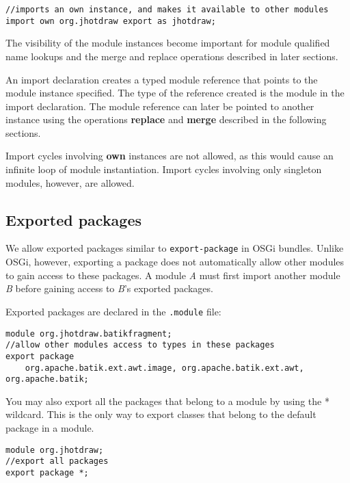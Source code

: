 \begin{lstlisting}
//imports an own instance, and makes it available to other modules
import own org.jhotdraw export as jhotdraw;
\end{lstlisting}

The visibility of the module instances become important for module
qualified name lookups and the merge and replace operations described in later
sections.

An import declaration creates a typed module reference that points to the module
instance specified. The type of the reference created is the module
in the import declaration. The module reference can later be pointed to another
instance using the operations \textbf{replace} and \textbf{merge} described
in the following sections.

Import cycles involving \textbf{own} instances are not allowed, as this would 
cause an infinite loop of module instantiation. Import cycles involving only
singleton modules, however, are allowed.

\subsection{Exported packages}

We allow exported packages similar to {\tt export-package} in OSGi bundles. Unlike OSGi, however,
exporting a package does not automatically allow other modules to gain
access to these packages. A module \textit{A} must first import another module \textit{B}
before gaining access to \textit{B}'s exported packages.

Exported packages are declared in the {\tt .module} file:

\begin{lstlisting}
module org.jhotdraw.batikfragment;
//allow other modules access to types in these packages
export package 
	org.apache.batik.ext.awt.image,	org.apache.batik.ext.awt,	org.apache.batik;
\end{lstlisting}

You may also export all the packages that belong to a module by using
the * wildcard. This is the only way to export classes that belong to
the default package in a module.

\begin{lstlisting}
module org.jhotdraw;
//export all packages
export package *;
\end{lstlisting}


